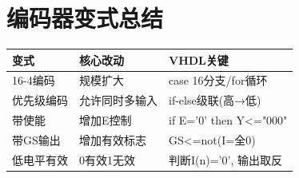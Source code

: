 \section{编码器变式总结}

\begin{examfocus}
\begin{center}
\begin{tabular}{|l|l|l|}
\hline
\textbf{变式} & \textbf{核心改动} & \textbf{VHDL关键} \\
\hline
16-4编码 & 规模扩大 & case 16分支/for循环 \\
优先级编码 & 允许同时多输入 & if-else级联(高→低) \\
带使能 & 增加E控制 & if E='0' then Y<="000" \\
带GS输出 & 增加有效标志 & GS<=not(I=全0) \\
低电平有效 & 0有效1无效 & 判断I(n)='0', 输出取反 \\
\hline
\end{tabular}
\end{center}
\end{examfocus}
